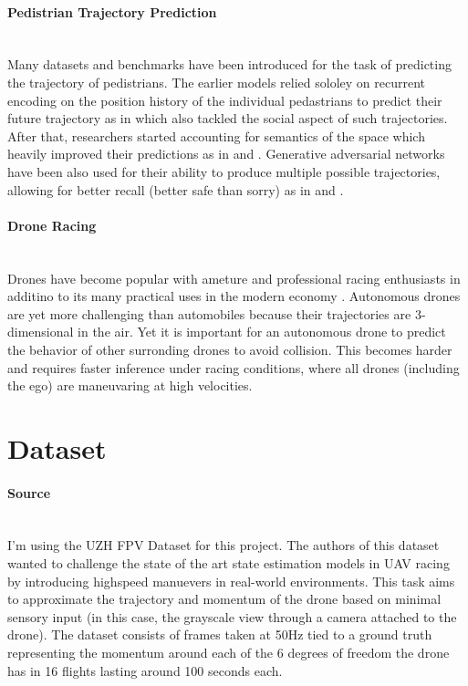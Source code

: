 \documentclass{article}
\begin{document}
\paragraph{Pedistrian Trajectory Prediction}$ $
\\Many datasets and benchmarks \cite{stanforddrone}\cite{trajneteval} have been introduced for the task of predicting the trajectory of pedistrians.  The earlier models relied sololey on recurrent encoding on the position history of the individual pedastrians to predict their future trajectory as in \cite{sociallstm} which also tackled the social aspect of such trajectories.  After that, researchers started accounting for semantics of the space which heavily improved their predictions as in \cite{ynet} and \cite{sophie}. Generative adversarial networks have been also used for their ability to produce multiple possible trajectories, allowing for better recall (better safe than sorry) as in \cite{sophie} and \cite{socialgan}. 

\paragraph{Drone Racing}$ $
\\Drones have become popular with ameture and professional racing enthusiasts in additino to its many practical uses in the modern economy \cite{Delmerico19icra}. Autonomous drones are yet more challenging than automobiles because their trajectories are 3-dimensional in the air. Yet it is important for an autonomous drone to predict the behavior of other surronding drones to avoid collision. This becomes harder and requires faster inference under racing conditions, where all drones (including the ego) are maneuvaring at high velocities.  

\section{Dataset}
\paragraph{Source}$ $
\\I'm using the UZH FPV Dataset \cite{Delmerico19icra} for this project. The authors of this dataset wanted to challenge the state of the art state estimation models in UAV racing by introducing highspeed manuevers in real-world environments. This task aims to approximate the trajectory and momentum of the drone based on minimal sensory input (in this case, the grayscale view through a camera attached to the drone). The dataset consists of frames taken at 50Hz tied to a ground truth representing the momentum around each of the 6 degrees of freedom the drone has in 16 flights lasting around 100 seconds each. 
\end{document}

